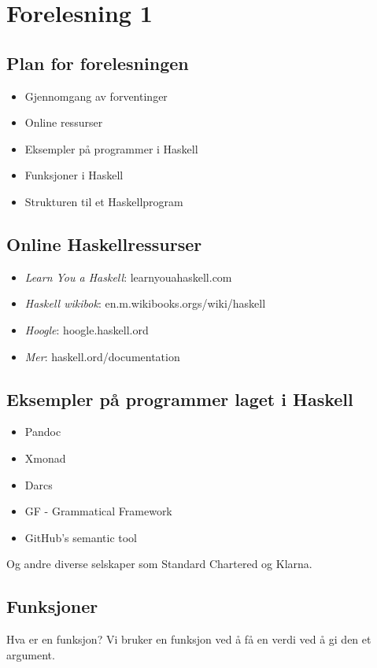 \documentclass[twocolumn]{article}
\begin{document}
\section{Forelesning 1}
\subsection{Plan for forelesningen}
\begin{itemize}
    \item Gjennomgang av forventinger
    \item Online ressurser
    \item Eksempler på programmer i Haskell
    \item Funksjoner i Haskell
    \item Strukturen til et Haskellprogram
\end{itemize}

\subsection{Online Haskellressurser}

\begin{itemize}
    \item \textit{Learn You a Haskell}: learnyouahaskell.com
    \item \textit{Haskell wikibok}: en.m.wikibooks.orgs/wiki/haskell
    \item \textit{Hoogle}: hoogle.haskell.ord
    \item \textit{Mer}: haskell.ord/documentation
\end{itemize}

\subsection{Eksempler på programmer laget i Haskell}
\begin{itemize}
    \item Pandoc
    \item Xmonad
    \item Darcs
    \item GF - Grammatical Framework
    \item GitHub's semantic tool
\end{itemize}

Og andre diverse selskaper som Standard Chartered og Klarna.

\subsection{Funksjoner}
Hva er en funksjon? Vi bruker en funksjon ved å få en verdi ved å gi den et argument.
\bigskip
\end{document}
